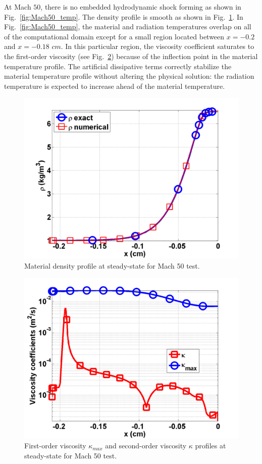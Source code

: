 \documentclass[review]{elsarticle}
\newcommand{\fig}[1]{Fig.~\ref{#1}}                      %
\begin{document}
At Mach $50$, there is no embedded hydrodynamic shock forming as shown in \fig{fig:Mach50_temp}. The density profile is smooth as shown in \fig{fig:Mach50_density}. In \fig{fig:Mach50_temp}, the material and radiation temperatures overlap on all of the computational domain except for a small region located between $x=-0.2$ and $x=-0.18$ $cm$. In this particular region, the viscosity coefficient saturates to the first-order viscosity (see \fig{fig:Mach50_viscosity}) because of the inflection point in the material temperature profile. The artificial dissipative terms correctly stabilize the material temperature profile without altering the physical solution: the radiation temperature is expected to increase ahead of the material temperature.
\begin{figure}[H]
                \centering
                \includegraphics[width=\textwidth]{Mach_50_nel_1000_density.png}
        \caption{Material density profile at steady-state for Mach 50 test.}\label{fig:Mach50_density}
\end{figure}
\begin{figure}[H]
                \centering
                \includegraphics[width=\textwidth]{Mach_50_nel_1000_viscosity.png}
        \caption{First-order viscosity $\kappa_{max}$ and second-order viscosity $\kappa$ profiles at steady-state for Mach 50 test.}\label{fig:Mach50_viscosity}
\end{figure}
\end{document}

